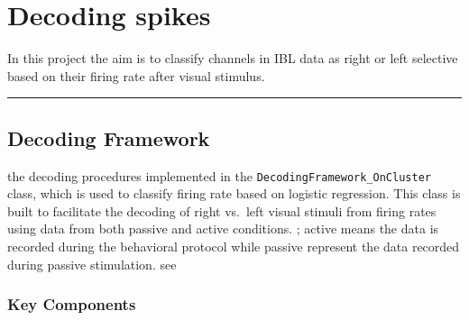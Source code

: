 \documentclass[
  letterpaper,
  DIV=11,
  numbers=noendperiod]{scrartcl}
\author{}
\date{}
\begin{document}
\section{Decoding spikes}\label{decoding-spikes}

In this project the aim is to classify channels in IBL data as right or
left selective based on their firing rate after visual stimulus.

\begin{center}\rule{0.5\linewidth}{0.5pt}\end{center}

\subsection{Decoding Framework}\label{decoding-framework}

the decoding procedures implemented in the
\texttt{DecodingFramework\_OnCluster} class, which is used to classify
firing rate based on logistic regression. This class is built to
facilitate the decoding of right vs.~left visual stimuli from firing
rates using data from both passive and active conditions. ; active means
the data is recorded during the behavioral protocol while passive
represent the data recorded during passive stimulation. see

\subsubsection{Key Components}\label{key-components}
\end{document}
